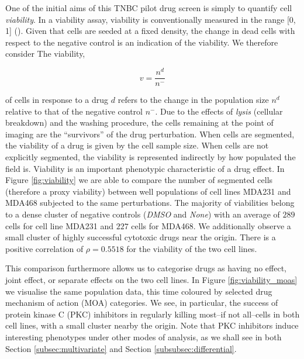 One of the initial aims of this TNBC pilot drug screen is simply to quantify cell \emph{viability}. In a viability assay, viability is conventionally measured in the range [0, 1] (\cite{pegg1989viability}). Given that cells are seeded at a fixed density, the change in dead cells with respect to the negative control is an indication of the viability.  We therefore consider The viability,

\begin{equation}
v = \frac{n^d}{n^-}
\end{equation}

of cells in response to a drug $d$ refers to the change in the population size $n^d$ relative to that of the negative control $n^-$. Due to the effects of \emph{lysis} (cellular breakdown) and the washing procedure, the cells remaining at the point of imaging are the ``survivors'' of the drug perturbation. When cells are segmented, the viability of a drug is given by the cell sample size. When cells are not explicitly segmented, the viability is represented indirectly by how populated the field is. Viability is an important phenotypic characteristic of a drug effect. In Figure \ref{fig:viability} we are able to compare the number of segmented cells (therefore a proxy viability) between well populations of cell lines MDA231 and MDA468 subjected to the same perturbations. The majority of viabilities belong to a dense cluster of negative controls (\emph{DMSO} and \emph{None}) with an average of $289$ cells for cell line MDA231 and $227$ cells for MDA468. We additionally observe a small cluster of highly successful cytotoxic drugs near the origin. There is a positive correlation of $\rho = 0.5518$ for the viability of the two cell lines.

This comparison furthermore allows us to categorise drugs as having no effect, joint effect, or separate effects on the two cell lines. In Figure \ref{fig:viability_moas} we visualise the same population data, this time coloured by selected drug mechanism of action (MOA) categories. We see, in particular, the success of protein kinase C (PKC) inhibitors in regularly killing most--if not all--cells in both cell lines, with a small cluster nearby the origin. Note that PKC inhibitors induce interesting phenotypes under other modes of analysis, as we shall see in both Section \ref{subsec:multivariate} and Section \ref{subsubsec:differential}.

